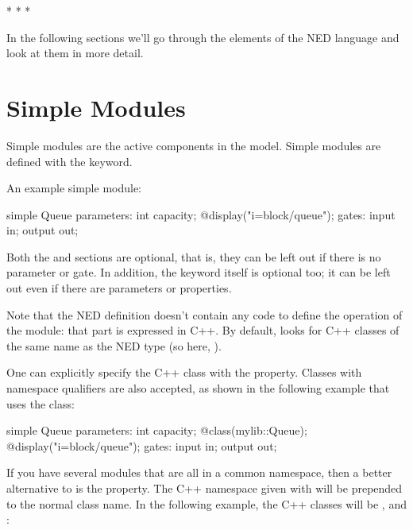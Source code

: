 \bigskip
\begin{center}
* * *
\end{center}
\bigskip

In the following sections we'll go through the elements of the NED
language and look at them in more detail.



\section{Simple Modules}
\label{sec:ch-ned-lang:simple-modules}

Simple modules are the active components in the model.
Simple modules are defined with the  keyword.

An example simple module:

\begin{ned}
simple Queue
{
    parameters:
        int capacity;
        @display("i=block/queue");
    gates:
        input in;
        output out;
}
\end{ned}

Both the  and  sections are optional, that is,
they can be left out if there is no parameter or gate. In addition, the
 keyword itself is optional too; it can be left out
even if there are parameters or properties.

Note that the NED definition doesn't contain any code to define the
operation of the module: that part is expressed in C++. By default, {\opp}
looks for C++ classes of the same name as the NED type (so here, ).

One can explicitly specify the C++ class with the  property.
Classes with namespace qualifiers are also accepted, as shown in the following
example that uses the  class:

\begin{ned}
simple Queue
{
    parameters:
        int capacity;
        @class(mylib::Queue);
        @display("i=block/queue");
    gates:
        input in;
        output out;
}
\end{ned}

If you have several modules that are all in a common namespace, then a
better alternative to  is the  property. The
C++ namespace given with  will be prepended to the normal
class name. In the following example, the C++ classes will be
,  and :


